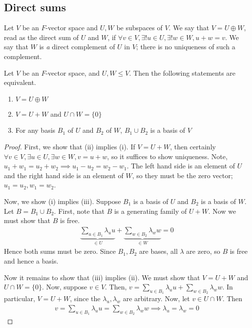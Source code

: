 \subsection{Direct sums}
\begin{definition}
    Let $V$ be an $F$-vector space and $U, W$ be subspaces of $V$.
    We say that $V = U \oplus W$, read as the direct sum of $U$ and $W$, if $\forall v \in V, \exists!
    u \in U, \exists!
    w \in W, u + w = v$.
    We say that $W$ is \textit{a} direct complement of $U$ in $V$; there is no uniqueness of such a complement.
\end{definition}
\begin{lemma}
    Let $V$ be an $F$-vector space, and $U, W \leq V$.
    Then the following statements are equivalent.
    \begin{enumerate}
        \item $V = U \oplus W$
        \item $V = U + W$ and $U \cap W = \{0\}$
        \item For any basis $B_1$ of $U$ and $B_2$ of $W$, $B_1 \cup B_2$ is a basis of $V$
    \end{enumerate}
\end{lemma}
\begin{proof}
    First, we show that (ii) implies (i).
    If $V = U + W$, then certainly $\forall v \in V, \exists u \in U, \exists w \in W, v = u + w$, so it suffices to show uniqueness.
    Note, $u_1 + w_1 = u_2 + w_2 \implies u_1 - u_2 = w_2 - w_1$.
    The left hand side is an element of $U$ and the right hand side is an element of $W$, so they must be the zero vector; $u_1 = u_2, w_1 = w_2$.

    Now, we show (i) implies (iii).
    Suppose $B_1$ is a basis of $U$ and $B_2$ is a basis of $W$.
    Let $B = B_1 \cup B_2$.
    First, note that $B$ is a generating family of $U + W$.
    Now we must show that $B$ is free.
    \begin{align*}
        \underbrace{\sum_{u \in B_1} \lambda_u u}_{\in U} + \underbrace{\sum_{w \in B_2} \lambda_w w}_{\in W} = 0
    \end{align*}
    Hence both sums must be zero.
    Since $B_1, B_2$ are bases, all $\lambda$ are zero, so $B$ is free and hence a basis.

    Now it remains to show that (iii) implies (ii).
    We must show that $V = U + W$ and $U \cap W = \{0\}$.
    Now, suppose $v \in V$.
    Then, $v = \sum_{u \in B_1} \lambda_u u + \sum_{w \in B_2} \lambda_w w$.
    In particular, $V = U + W$, since the $\lambda_u, \lambda_w$ are arbitrary.
    Now, let $v \in U \cap W$.
    Then
    \begin{align*}
        v = \sum_{u \in B_1} \lambda_u u = \sum_{w \in B_2} \lambda_w w \implies \lambda_u = \lambda_w = 0
    \end{align*}
\end{proof}

